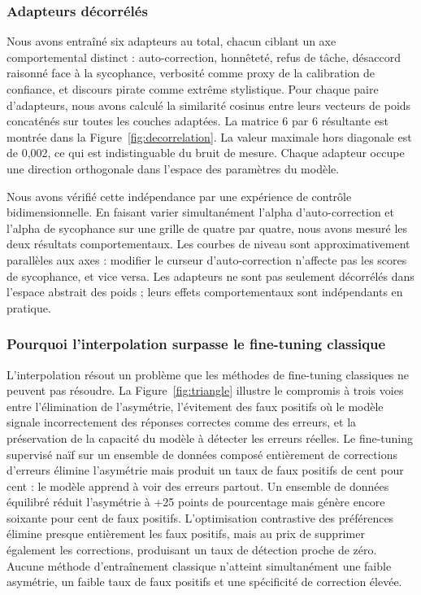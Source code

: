 \documentclass[11pt,a4paper]{article}
\begin{document}
\subsubsection{Adapteurs décorrélés}

Nous avons entraîné six adapteurs au total, chacun ciblant un axe comportemental distinct : auto-correction, honnêteté, refus de tâche, désaccord raisonné face à la sycophance, verbosité comme proxy de la calibration de confiance, et discours pirate comme extrême stylistique. Pour chaque paire d'adapteurs, nous avons calculé la similarité cosinus entre leurs vecteurs de poids concaténés sur toutes les couches adaptées. La matrice 6 par 6 résultante est montrée dans la Figure~\ref{fig:decorrelation}. La valeur maximale hors diagonale est de 0,002, ce qui est indistinguable du bruit de mesure. Chaque adapteur occupe une direction orthogonale dans l'espace des paramètres du modèle.

Nous avons vérifié cette indépendance par une expérience de contrôle bidimensionnelle. En faisant varier simultanément l'alpha d'auto-correction et l'alpha de sycophance sur une grille de quatre par quatre, nous avons mesuré les deux résultats comportementaux. Les courbes de niveau sont approximativement parallèles aux axes : modifier le curseur d'auto-correction n'affecte pas les scores de sycophance, et vice versa. Les adapteurs ne sont pas seulement décorrélés dans l'espace abstrait des poids ; leurs effets comportementaux sont indépendants en pratique.

\subsubsection{Pourquoi l'interpolation surpasse le fine-tuning classique}

L'interpolation résout un problème que les méthodes de fine-tuning classiques ne peuvent pas résoudre. La Figure~\ref{fig:triangle} illustre le compromis à trois voies entre l'élimination de l'asymétrie, l'évitement des faux positifs où le modèle signale incorrectement des réponses correctes comme des erreurs, et la préservation de la capacité du modèle à détecter les erreurs réelles. Le fine-tuning supervisé naïf sur un ensemble de données composé entièrement de corrections d'erreurs élimine l'asymétrie mais produit un taux de faux positifs de cent pour cent : le modèle apprend à voir des erreurs partout. Un ensemble de données équilibré réduit l'asymétrie à +25 points de pourcentage mais génère encore soixante pour cent de faux positifs. L'optimisation contrastive des préférences élimine presque entièrement les faux positifs, mais au prix de supprimer également les corrections, produisant un taux de détection proche de zéro. Aucune méthode d'entraînement classique n'atteint simultanément une faible asymétrie, un faible taux de faux positifs et une spécificité de correction élevée.
\end{document}
